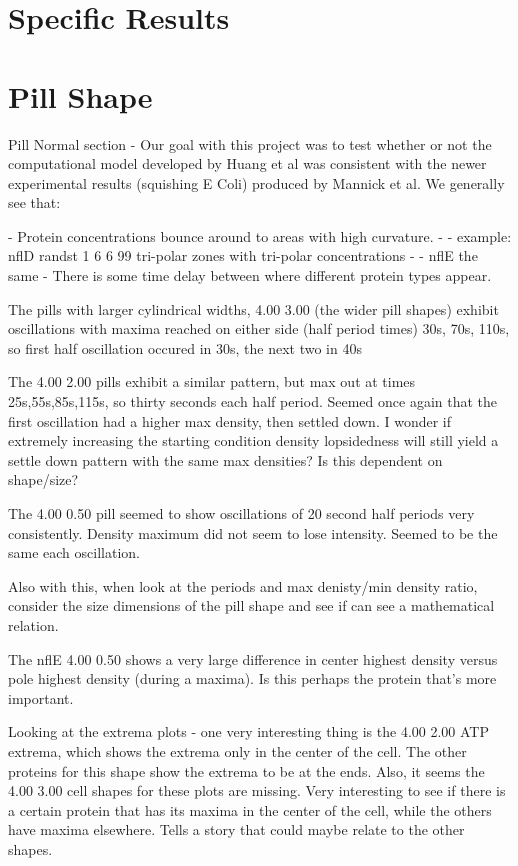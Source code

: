 \documentclass[letterpaper,twocolumn,amsmath,amssymb,pre]{revtex4-1}
\begin{document}
\section{Specific Results}
\section{Pill Shape}
Pill Normal section - 
Our goal with this project was to test whether or not the computational model developed by
Huang et al was consistent with the newer experimental results (squishing E
Coli) produced by Mannick et al. We generally see that:

- Protein concentrations bounce around to areas with high curvature.
- - example: nflD randst 1 6 6 99 tri-polar zones with tri-polar concentrations
- - nflE the same
- There is some time delay between where different protein types appear.



The pills with larger cylindrical widths, 4.00 3.00 (the wider pill shapes)
exhibit oscillations with maxima reached on either side (half period
times) 30s, 70s, 110s, so first half oscillation occured in 30s, the
next two in 40s

The 4.00 2.00 pills exhibit a similar pattern, but max out at times
25s,55s,85s,115s, so thirty seconds each half period.  Seemed once again that
the first oscillation had a higher max density, then settled down.  I
wonder if extremely increasing the starting condition density
lopsidedness will still yield a settle down pattern with the same max
densities?  Is this dependent on shape/size?

The 4.00 0.50 pill seemed to show oscillations of 20 second half
periods very consistently.  Density maximum did not seem to lose
intensity.  Seemed to be the same each oscillation.

 Also with this, when look at the periods and max
denisty/min density ratio, consider the size dimensions of the pill
shape and see if can see a mathematical relation.

The nflE 4.00 0.50 shows a very large difference in center highest density
versus pole highest density (during a maxima).  Is this perhaps the
protein that's more important.

Looking at the extrema plots - one very interesting thing is the 4.00
2.00 ATP extrema, which shows the extrema only in the center of the
cell.  The other proteins for this shape show the extrema to be at the
ends.  Also, it seems the 4.00 3.00 cell shapes for these plots are
missing.  Very interesting to see if there is a certain protein that
has its maxima in the center of the cell, while the others have maxima
elsewhere.  Tells a story that could maybe relate to the other shapes.
\end{document}
